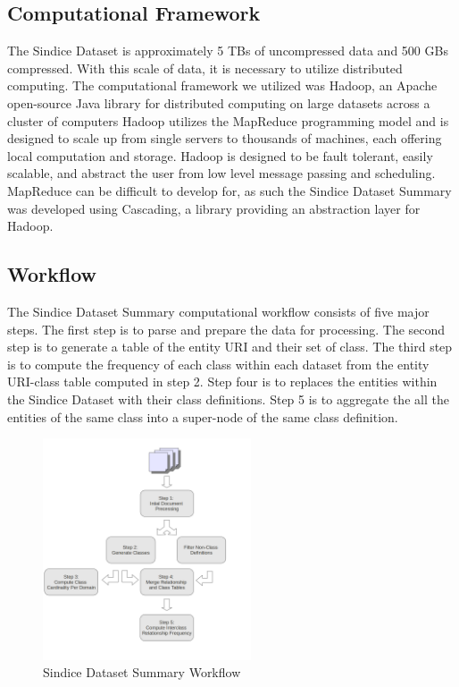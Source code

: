\documentclass[11pt,onecolumn]{article}
\begin{document}
\subsection{Computational Framework}

The Sindice Dataset is approximately 5 TBs of uncompressed data and 500 GBs compressed.  With this scale of data, it is necessary to utilize distributed computing.  The computational framework we utilized was Hadoop, an Apache open-source Java library for distributed computing on large datasets across a cluster of computers  Hadoop utilizes the MapReduce programming model and is designed to scale up from single servers to thousands of machines, each offering local computation and storage. Hadoop is designed to be fault tolerant, easily scalable, and abstract the user from low level message passing and scheduling.  MapReduce can be difficult to develop for, as such the Sindice Dataset Summary was developed using Cascading, a library providing an abstraction layer for Hadoop.

\subsection{Workflow}

The Sindice Dataset Summary computational workflow consists of five major steps.  The first step is to parse and prepare the data for processing.  The second step is to generate a table of the entity URI and their set of class.  The third step is to compute the frequency of each class within each dataset from the entity URI-class table computed in step 2.  Step four is to replaces the entities within the Sindice Dataset with their class definitions.  Step 5 is to aggregate the all the entities of the same class into a super-node of the same class definition. 

\begin{figure}
  \centering
    \includegraphics[width=0.55\textwidth]{workflow.png}
    \caption{Sindice Dataset Summary Workflow}
\end{figure}
\end{document}
